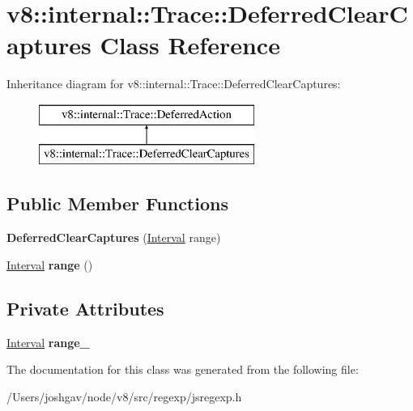 \hypertarget{classv8_1_1internal_1_1_trace_1_1_deferred_clear_captures}{}\section{v8\+:\+:internal\+:\+:Trace\+:\+:Deferred\+Clear\+Captures Class Reference}
\label{classv8_1_1internal_1_1_trace_1_1_deferred_clear_captures}
Inheritance diagram for v8\+:\+:internal\+:\+:Trace\+:\+:Deferred\+Clear\+Captures\+:\begin{figure}[H]
\begin{center}
\leavevmode
\includegraphics[height=2.000000cm]{classv8_1_1internal_1_1_trace_1_1_deferred_clear_captures}
\end{center}
\end{figure}
\subsection*{Public Member Functions}
\begin{DoxyCompactItemize}
\item 
{\bfseries Deferred\+Clear\+Captures} (\hyperlink{classv8_1_1internal_1_1_interval}{Interval} range)\hypertarget{classv8_1_1internal_1_1_trace_1_1_deferred_clear_captures_a1449af3c613a25426e4dd99d5ee496d4}{}\label{classv8_1_1internal_1_1_trace_1_1_deferred_clear_captures_a1449af3c613a25426e4dd99d5ee496d4}

\item 
\hyperlink{classv8_1_1internal_1_1_interval}{Interval} {\bfseries range} ()\hypertarget{classv8_1_1internal_1_1_trace_1_1_deferred_clear_captures_a195b6197459bcdc53ecc6b8f3818bbd4}{}\label{classv8_1_1internal_1_1_trace_1_1_deferred_clear_captures_a195b6197459bcdc53ecc6b8f3818bbd4}

\end{DoxyCompactItemize}
\subsection*{Private Attributes}
\begin{DoxyCompactItemize}
\item 
\hyperlink{classv8_1_1internal_1_1_interval}{Interval} {\bfseries range\+\_\+}\hypertarget{classv8_1_1internal_1_1_trace_1_1_deferred_clear_captures_a8eba01e41802dcc317353a20a690ab0c}{}\label{classv8_1_1internal_1_1_trace_1_1_deferred_clear_captures_a8eba01e41802dcc317353a20a690ab0c}

\end{DoxyCompactItemize}


The documentation for this class was generated from the following file\+:\begin{DoxyCompactItemize}
\item 
/\+Users/joshgav/node/v8/src/regexp/jsregexp.\+h\end{DoxyCompactItemize}

